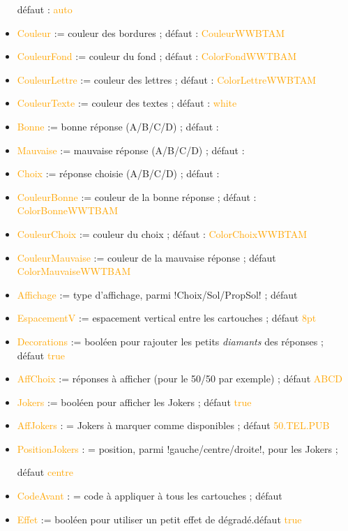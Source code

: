 \documentclass[french,a4paper,11pt]{article}
\newcommand\Cle[1]{{\small\sffamily\textlangle \textcolor{orange}{#1}\textrangle}}
\newcommand\cmaj[1]{\tcbox[vignetteMaJ]{#1}\xspace}
\begin{document}
\begin{tipblock}
\begin{itemize}
	\hfill{}défaut : \Cle{auto}
	\item \Cle{Couleur} := couleur des bordures ; \hfill{}défaut : \Cle{CouleurWWBTAM}
	\item \Cle{CouleurFond} := couleur du fond ; \hfill{}défaut : \Cle{ColorFondWWTBAM}
	\item \Cle{CouleurLettre} := couleur des lettres ; \hfill{}défaut : \Cle{ColorLettreWWBTAM}
	\item \Cle{CouleurTexte} := couleur des textes ; \hfill{}défaut : \Cle{white}
	\item \Cle{Bonne} := bonne réponse (A/B/C/D) ; \hfill{}défaut : \Cle{}
	\item \Cle{Mauvaise} := mauvaise réponse (A/B/C/D) ; \hfill{}défaut : \Cle{}
	\item \Cle{Choix} := réponse choisie (A/B/C/D) ; \hfill{}défaut : \Cle{}
	\item \Cle{CouleurBonne} := couleur de la bonne réponse ; \hfill{}défaut : \Cle{ColorBonneWWTBAM}
	\item \Cle{CouleurChoix} := couleur du choix ; \hfill{}défaut : \Cle{ColorChoixWWBTAM}
	\item \Cle{CouleurMauvaise} := couleur de la mauvaise réponse ; \hfill{}défaut \Cle{ColorMauvaiseWWTBAM}
	\item \Cle{Affichage} := type d'affichage, parmi \motcletex!Choix/Sol/PropSol! ; \hfill{}défaut \Cle{}
	\item \Cle{EspacementV} := espacement vertical entre les cartouches ; \hfill{}défaut \Cle{8pt}
	\item \Cle{Decorations} := booléen pour rajouter les petits \textit{diamants} des réponses  ; \hfill{}défaut \Cle{true}
	\item \Cle{AffChoix} := réponses à afficher (pour le 50/50 par exemple)  ; \hfill{}défaut \Cle{ABCD}
	\item \Cle{Jokers} := booléen pour afficher les Jokers ; \hfill{}défaut \Cle{true}
	\item \Cle{AffJokers} : = Jokers à marquer comme disponibles ; \hfill{}défaut \Cle{50.TEL.PUB}
	\item \cmaj{0.1.1} \Cle{PositionJokers} : = position, parmi \motcletex!gauche/centre/droite!, pour les Jokers ;
	
	\hfill{}défaut \Cle{centre}
	\item \cmaj{0.1.1} \Cle{CodeAvant} : = code à appliquer à tous les cartouches ; \hfill{}défaut \Cle{}
	\item \Cle{Effet} := booléen pour utiliser un petit effet de dégradé.\hfill{}défaut \Cle{true}
\end{itemize}
\vspace*{-\baselineskip}\leavevmode
\end{tipblock}
\end{document}
